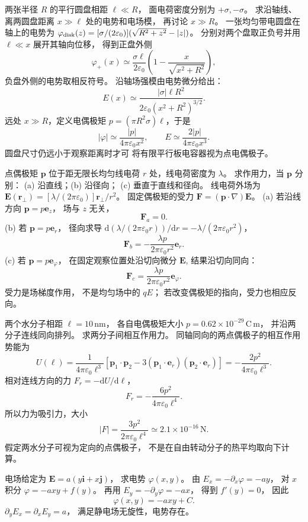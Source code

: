 两张半径 $R$ 的平行圆盘相距
$\ell\ll R$，
面电荷密度分别为 $+\sigma,-\sigma$。
求沿轴线、离两圆盘距离
$x\gg\ell$ 处的电势和电场模，
再讨论 $x\gg R$。
\exsolution
一张均匀带电圆盘在轴上的电势为
$\varphi_{\rm disk}(z)=
[\sigma/(2\varepsilon_0)]
(\sqrt{R^2+z^2}-|z|)$。
分别对两个盘取正负号并用
$\ell\ll x$ 展开其轴向位移，
得到正盘外侧
\[
\boxed{\varphi_+(x)\simeq
\frac{\sigma\ell}{2\varepsilon_0}
\left(1-\frac{x}{\sqrt{x^2+R^2}}\right)},
\]
负盘外侧的电势取相反符号。
沿轴场强模由电势微分给出：
\[
\boxed{E(x)\simeq
\frac{|\sigma|\ell R^2}
{2\varepsilon_0(x^2+R^2)^{3/2}}}.
\]
远处 $x\gg R$，定义电偶极矩
$p=(\pi R^2\sigma)\ell$，于是
\[
\boxed{|\varphi|\simeq
\frac{|p|}{4\pi\varepsilon_0x^2}},\qquad
\boxed{E\simeq\frac{2|p|}{4\pi\varepsilon_0x^3}}.
\]
\excheck 圆盘尺寸仍远小于观察距离时才可
将有限平行板电容器视为点电偶极子。

点偶极矩 $\bm p$ 位于距无限长均匀线电荷
$r$ 处，线电荷密度为 $\lambda$。
求作用力，当 $\bm p$ 分别：
(a) 沿直线；(b) 沿径向；
(c) 垂直于直线和径向。
\exsolution
线电荷外场为
$\bm E(\bm r_\perp)=
[\lambda/(2\pi\varepsilon_0)]\bm r_\perp/r^2$。
固定偶极矩的受力
$\bm F=(\bm p\cdot\nabla)\bm E$。
(a) 若沿线方向 $\bm p=p\bm e_z$，
场与 $z$ 无关，
\[
\boxed{\bm F_a=0}.
\]
(b) 若 $\bm p=p\bm e_r$，
径向求导
$\mathrm d(\lambda/(2\pi\varepsilon_0r))/\mathrm dr
=-\lambda/(2\pi\varepsilon_0r^2)$，
\[
\boxed{\bm F_b=
-\frac{\lambda p}{2\pi\varepsilon_0r^2}\bm e_r}.
\]
(c) 若 $\bm p=p\bm e_\varphi$，
在固定观察位置处沿切向微分
$\bm E$, 结果沿切向同向：
\[
\boxed{\bm F_c=
\frac{\lambda p}{2\pi\varepsilon_0r^2}\bm e_\varphi}.
\]
\excheck 受力是场梯度作用，
不是均匀场中的 $qE$；
若改变偶极矩的指向，受力也相应反向。

两个水分子相距
$\ell=10\,\mathrm{nm}$，
各自电偶极矩大小
$p=0.62\times10^{-29}\,\mathrm{C\,m}$，
并沿两分子连线同向排列。
求两分子间相互作用力。
\exsolution
同轴同向的两点偶极子的相互作用势能为
\[
U(\ell)=
\frac{1}{4\pi\varepsilon_0\ell^3}
[\bm p_1\cdot\bm p_2
-3(\bm p_1\cdot\bm e_r)(\bm p_2\cdot\bm e_r)]
=-\frac{2p^2}{4\pi\varepsilon_0\ell^3}.
\]
相对连线方向的力
$F_r=-\mathrm dU/\mathrm d\ell$，
\[
F_r=-\frac{6p^2}{4\pi\varepsilon_0\ell^4}.
\]
所以力为吸引力，大小
\[
\boxed{|F|=
\frac{3p^2}{2\pi\varepsilon_0\ell^4}
\simeq2.1\times10^{-16}\,\mathrm N}.
\]
\excheck 假定两水分子可视为定向的点偶极子，
不是在自由转动分子的热平均取向下计算。

电场给定为
$\bm E=a(y\bm i+x\bm j)$，
求电势 $\varphi(x,y)$。
\exsolution
由 $E_x=-\partial_x\varphi=-ay$，
对 $x$ 积分
$\varphi=-axy+f(y)$。
再用 $E_y=-\partial_y\varphi=-ax$，
得到 $f'(y)=0$，
因此
\[
\boxed{\varphi(x,y)=-axy+C}.
\]
\excheck $\partial_yE_x=\partial_xE_y=a$，
满足静电场无旋性，电势存在。

